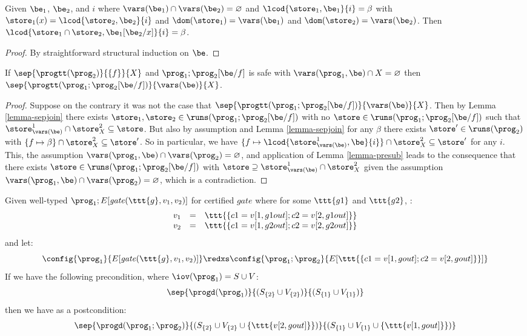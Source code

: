 \begin{lemma}
  \label{lemma-presub}
  Given $\be_1$, $\be_2$, and $i$ where $\vars(\be_1) \cap
  \vars(\be_2) = \varnothing$ and $\lcod{\store_1,\be_1}{i} = \beta$
  with $\store_1(x) = \lcod{\store_2,\be_2}{i}$ and
  $\dom(\store_1) = \vars(\be_1)$ and $\dom(\store_2) = \vars(\be_2)$.
  Then $\lcod{\store_1\cap\store_2,\be_1[\be_2/x]}{i} = \beta$.
\end{lemma}
\begin{proof}
By straightforward structural induction on $\be$.
\end{proof}

\begin{lemma}[Substitution]
  \label{lemma-substitution}
  If $\sep{\progtt(\prog_2)}{\{ f \}}{X}$ and
  $\prog_1;\prog_2[\be/f]$ is safe with $\vars(\prog_1,\be) \cap
  X = \varnothing$ then
  $\sep{\progtt(\prog_1;\prog_2[\be/f])}{\vars(\be)}{X}$.
\end{lemma}
\begin{proof}
  Suppose on the contrary it was not the case that
  $\sep{\progtt(\prog_1;\prog_2[\be/f])}{\vars(\be)}{X}$.
  Then by Lemma \ref{lemma-sepjoin} there exists $\store_1,\store_2
  \in \runs(\prog_1;\prog_2[\be/f])$ with no $\store \in
  \runs(\prog_1;\prog_2[\be/f])$ such that $\store^1_{\vars(\be)}
  \cap \store^2_X \subseteq \store$.  But also by
  assumption and Lemma \ref{lemma-sepjoin} for any $\beta$ there
  exists $\store' \in \runs(\prog_2)$ with $\{ f \mapsto \beta \} \cap
  \store^2_X \subseteq \store'$. So in particular, we
  have $\{ f \mapsto \lcod{\store^1_{\vars(\be)},\be}{i} \} \cap
  \store^2_X \subseteq \store'$ for any $i$. This, the
  assumption $\vars(\prog_1,\be) \cap \vars(\prog_2) = \varnothing$,
  and application of Lemma \ref{lemma-presub} leads to the consequence
  that there exists $\store \in \runs(\prog_1;\prog_2[\be/f])$ with
  $\store \supseteq \store^1_{\vars(\be)} \cap
  \store^2_X$ given the assumption $\vars(\prog_1,\be)
  \cap \vars(\prog_2) = \varnothing$, which is a contradiction.
\end{proof}

\begin{lemma}
  \label{lemma-preservation-gmw}
  Given well-typed $\prog_1;E[\mathit{gate}(\ttt{g},v_1,v_2)]$ for certified $\mathit{gate}$ where
  for some $\ttt{g1}$ and $\ttt{g2}$, :
  $$
  \begin{array}{lcr}
   v_1 &=& \ttt{\{c1 = v[1,g1out]; c2 = v[2,g1out]\}}\\
   v_2 &=& \ttt{\{c1 = v[1,g2out]; c2 = v[2,g2out]\}}
  \end{array}
  $$
  and let:
  $$
  \config{\prog_1}{E[\mathit{gate}(\ttt{g},v_1,v_2)]} \redxs \config{\prog_1;\prog_2}{E[\ttt{\{c1 = v[1,gout]; c2 = v[2,gout]\}}]}
  $$
  If we have the following precondition, where $\iov(\prog_1) = S \cup V$:
  $$
  \sep{\progd(\prog_1)}{(S_{\{2\}} \cup V_{\{2\}})}{(S_{\{1\}} \cup V_{\{1\}})}
  $$
  then we have as a postcondition:
  $$
  \sep{\progd(\prog_1;\prog_2)}{(S_{\{2\}} \cup V_{\{2\}} \cup \{ \ttt{v[2,gout]} \})}{(S_{\{1\}} \cup V_{\{1\}} \cup \{ \ttt{v[1,gout]} \})}
  $$
\end{lemma}

